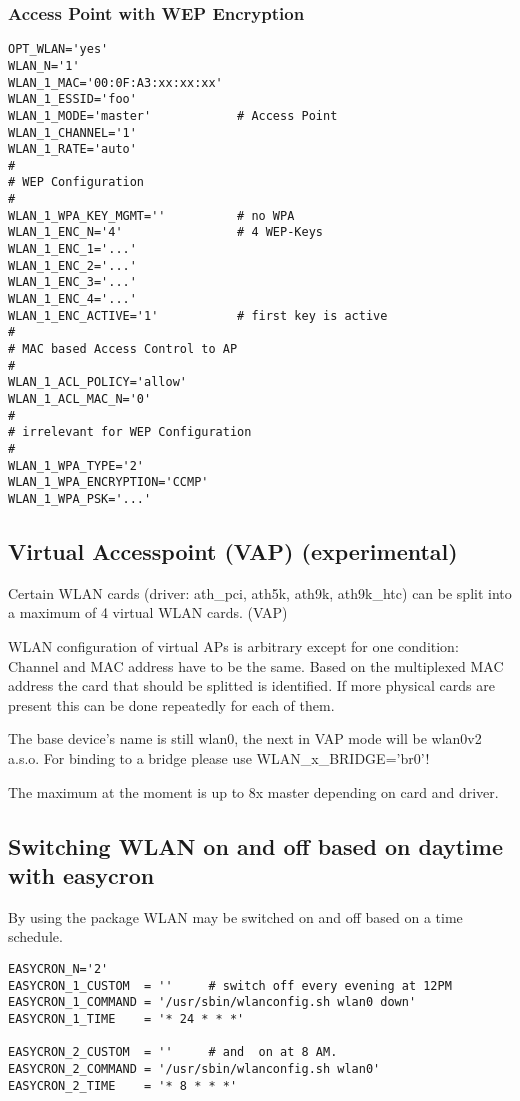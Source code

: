 \subsubsection{Access Point with WEP Encryption}
\begin{example}
\begin{verbatim}
OPT_WLAN='yes'
WLAN_N='1'
WLAN_1_MAC='00:0F:A3:xx:xx:xx'
WLAN_1_ESSID='foo'
WLAN_1_MODE='master'            # Access Point
WLAN_1_CHANNEL='1'
WLAN_1_RATE='auto'
#
# WEP Configuration
#
WLAN_1_WPA_KEY_MGMT=''          # no WPA 
WLAN_1_ENC_N='4'                # 4 WEP-Keys
WLAN_1_ENC_1='...'
WLAN_1_ENC_2='...'
WLAN_1_ENC_3='...'
WLAN_1_ENC_4='...'
WLAN_1_ENC_ACTIVE='1'           # first key is active
#
# MAC based Access Control to AP
#
WLAN_1_ACL_POLICY='allow'
WLAN_1_ACL_MAC_N='0'
# 
# irrelevant for WEP Configuration
#
WLAN_1_WPA_TYPE='2'
WLAN_1_WPA_ENCRYPTION='CCMP'
WLAN_1_WPA_PSK='...'

\end{verbatim}
\end{example}

\subsection{Virtual Accesspoint (VAP) (experimental)}

Certain WLAN cards (driver: ath\_pci, ath5k, ath9k, ath9k\_htc) can be split into 
a maximum of 4 virtual WLAN cards. (VAP)

WLAN configuration of virtual APs is arbitrary except for one condition:
Channel and MAC address have to be the same. Based on the multiplexed MAC address 
the card that should be splitted is identified. If more physical cards are 
present this can be done repeatedly for each of them.

The base device's name is still wlan0, the next in VAP mode will be wlan0v2 a.s.o.
For binding to a bridge please use WLAN\_x\_BRIDGE='br0'!

The maximum at the moment is up to 8x master depending on card and driver.

\subsection{Switching WLAN on and off based on daytime with easycron}

By using the package  WLAN may be 
switched on and off based on a time schedule.

\begin{example}
\begin{verbatim}
EASYCRON_N='2'
EASYCRON_1_CUSTOM  = ''     # switch off every evening at 12PM
EASYCRON_1_COMMAND = '/usr/sbin/wlanconfig.sh wlan0 down'
EASYCRON_1_TIME    = '* 24 * * *'

EASYCRON_2_CUSTOM  = ''     # and  on at 8 AM.
EASYCRON_2_COMMAND = '/usr/sbin/wlanconfig.sh wlan0'
EASYCRON_2_TIME    = '* 8 * * *'
\end{verbatim}
\end{example}

